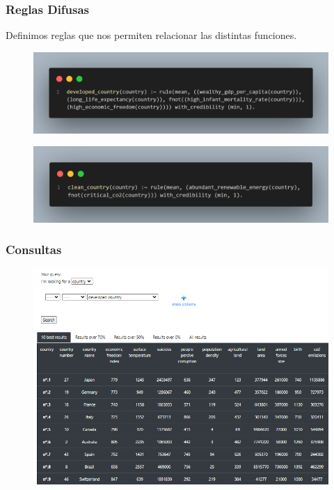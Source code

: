 \documentclass{beamer}
\newcommand{\slideauthor}[1]{\gdef\insertslideauthor{#1}}
\newcommand{\insertslideauthor}{}
\begin{document}
\begin{frame}
\frametitle{Reglas Difusas}
\slideauthor{Javier Comyn}
Definimos reglas que nos permiten relacionar las distintas funciones.
\begin{figure}
    \centering
    \includegraphics[width=\linewidth]{Images/developed_country.png}
\end{figure}
\begin{figure}
    \centering
    \includegraphics[width=\linewidth]{Images/clean_country.png}
\end{figure}
\end{frame}

\begin{frame}
\frametitle{Consultas}
\slideauthor{Javier Comyn}
\begin{figure}
\includegraphics[width=\textwidth]{Images/developed_country (1).png} 
\end{figure}
\end{frame}
\end{document}
